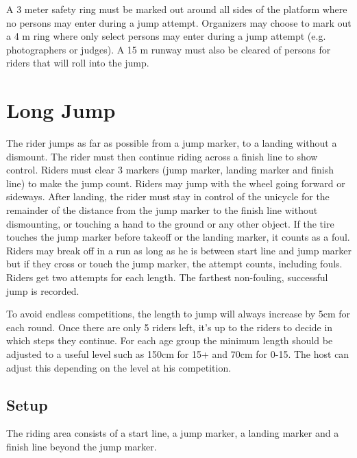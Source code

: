 A 3 meter safety ring must be marked out around all sides of the platform where no persons may enter during a jump attempt.
Organizers may choose to mark out a 4 m ring where only select persons may enter during a jump attempt (e.g. photographers or judges).
A 15 m runway must also be cleared of persons for riders that will roll into the jump.

\section{Long Jump}
The rider jumps as far as possible from a jump marker, to a landing without a dismount.
The rider must then continue riding across a finish line to show control.
Riders must clear 3 markers (jump marker, landing marker and finish line) to make the jump count.
Riders may jump with the wheel going forward or sideways.
After landing, the rider must stay in control of the unicycle for the remainder of the distance from the jump marker to the finish line without dismounting, or touching a hand to the ground or any other object.
If the tire touches the jump marker before takeoff or the landing marker, it counts as a foul.
Riders may break off in a run as long as he is between start line and jump marker but if they cross or touch the jump marker, the attempt counts, including fouls.
Riders get two attempts for each length.
The farthest non-fouling, successful jump is recorded.

To avoid endless competitions, the length to jump will always increase by 5cm for each round.
Once there are only 5 riders left, it's up to the riders to decide in which steps they continue.
For each age group the minimum length should be adjusted to a useful level such as 150cm for 15+ and 70cm for 0-15.
The host can adjust this depending on the level at his competition.

\subsection{Setup}
The riding area consists of a start line, a jump marker, a landing marker and a finish line beyond the jump marker.

